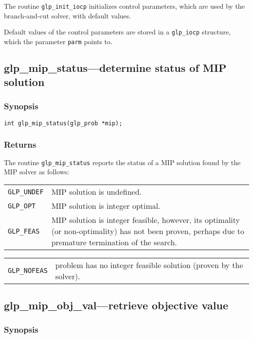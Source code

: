 The routine \verb|glp_init_iocp| initializes control parameters, which
are used by the branch-and-cut solver, with default values.

Default values of the control parameters are stored in a \verb|glp_iocp|
structure, which the parameter \verb|parm| points to.

\subsection{glp\_mip\_status---determine status of MIP solution}

\subsubsection*{Synopsis}

\begin{verbatim}
int glp_mip_status(glp_prob *mip);
\end{verbatim}

\subsubsection*{Returns}

The routine \verb|glp_mip_status| reports the status of a MIP solution
found by the MIP solver as follows:

\smallskip

\begin{tabular}{@{}p{25mm}p{91.3mm}@{}}
\verb|GLP_UNDEF| & MIP solution is undefined. \\
\verb|GLP_OPT|   & MIP solution is integer optimal. \\
\verb|GLP_FEAS|  & MIP solution is integer feasible, however, its
   optimality (or non-optimality) has not been proven, perhaps due to
   premature termination of the search. \\
\end{tabular}

\begin{tabular}{@{}p{25mm}p{91.3mm}@{}}
\verb|GLP_NOFEAS| & problem has no integer feasible solution (proven by
   the solver). \\
\end{tabular}

\subsection{glp\_mip\_obj\_val---retrieve objective value}

\subsubsection*{Synopsis}

